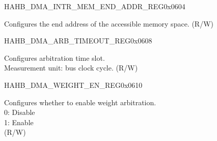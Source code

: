 \begin{register}{H}{AHB\_DMA\_INTR\_MEM\_END\_ADDR\_REG}{0x0604}\label{regdesc:AHBDMAINTRMEMENDADDRREG}
%
\regnewline%
\begin{regdesc}\begin{reglist}
\label{fielddesc:AHBDMAACCESSINTRMEMENDADDR}\item [AHB\_DMA\_ACCESS\_INTR\_MEM\_END\_ADDR] Configures the end address of the accessible memory space. (R/W)
\end{reglist}\end{regdesc}
\end{register}


\begin{register}{H}{AHB\_DMA\_ARB\_TIMEOUT\_REG}{0x0608}\label{regdesc:AHBDMAARBTIMEOUTREG}
%
%
\regnewline%
\begin{regdesc}\begin{reglist}
\label{fielddesc:AHBDMAARBTIMEOUT}\item [AHB\_DMA\_ARB\_TIMEOUT] Configures arbitration time slot.\\Measurement unit: bus clock cycle. (R/W)
\end{reglist}\end{regdesc}
\end{register}


\begin{register}{H}{AHB\_DMA\_WEIGHT\_EN\_REG}{0x0610}\label{regdesc:AHBDMAWEIGHTENREG}
%
%
\regnewline%
\begin{regdesc}\begin{reglist}
\label{fielddesc:AHBDMAWEIGHTEN}\item [AHB\_DMA\_WEIGHT\_EN] Configures whether to enable weight arbitration.\\0: Disable\\1: Enable\\ (R/W)
\end{reglist}\end{regdesc}
\end{register}


